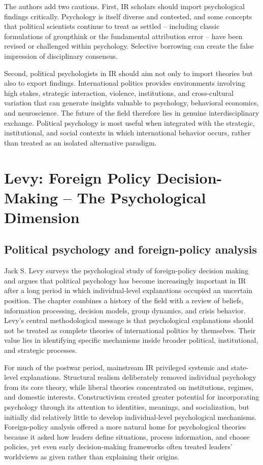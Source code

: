 The authors add two cautions. First, IR scholars should import psychological findings critically. Psychology is itself diverse and contested, and some concepts that political scientists continue to treat as settled -- including classic formulations of groupthink or the fundamental attribution error -- have been revised or challenged within psychology. Selective borrowing can create the false impression of disciplinary consensus.

Second, political psychologists in IR should aim not only to import theories but also to export findings. International politics provides environments involving high stakes, strategic interaction, violence, institutions, and cross-cultural variation that can generate insights valuable to psychology, behavioral economics, and neuroscience. The future of the field therefore lies in genuine interdisciplinary exchange. Political psychology is most useful when integrated with the strategic, institutional, and social contexts in which international behavior occurs, rather than treated as an isolated alternative paradigm.

\clearpage
\section{Levy: Foreign Policy Decision-Making -- The Psychological Dimension}

\subsection{Political psychology and foreign-policy analysis}

Jack S. Levy surveys the psychological study of foreign-policy decision making and argues that political psychology has become increasingly important in IR after a long period in which individual-level explanations occupied an uncertain position. The chapter combines a history of the field with a review of beliefs, information processing, decision models, group dynamics, and crisis behavior. Levy's central methodological message is that psychological explanations should not be treated as complete theories of international politics by themselves. Their value lies in identifying specific mechanisms inside broader political, institutional, and strategic processes.

For much of the postwar period, mainstream IR privileged systemic and state-level explanations. Structural realism deliberately removed individual psychology from its core theory, while liberal theories concentrated on institutions, regimes, and domestic interests. Constructivism created greater potential for incorporating psychology through its attention to identities, meanings, and socialization, but initially did relatively little to develop individual-level psychological mechanisms. Foreign-policy analysis offered a more natural home for psychological theories because it asked how leaders define situations, process information, and choose policies, yet even early decision-making frameworks often treated leaders' worldviews as given rather than explaining their origins.

